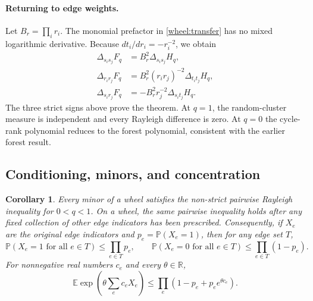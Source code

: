 \documentclass[11pt,a4paper]{article}
\newtheorem{corollary}[theorem]{Corollary}
\theoremstyle{definition}
\theoremstyle{remark}\newtheorem{remark}[theorem]{Remark}
\begin{document}
\paragraph{Returning to edge weights.}
Let $B_r=\prod_i r_i$. The monomial prefactor in \eqref{wheel:transfer} has no mixed logarithmic derivative. Because $dt_i/dr_i=-r_i^{-2}$, we obtain
\begin{align*}
 \Delta_{s_i s_j}F_q&=B_r^2\Delta_{s_i s_j}H_q,\\
 \Delta_{r_i r_j}F_q&=B_r^2(r_i r_j)^{-2}\Delta_{t_i t_j}H_q,\\
 \Delta_{s_i r_j}F_q&=-B_r^2r_j^{-2}\Delta_{s_i t_j}H_q.
\end{align*}
The three strict signs above prove the theorem. At $q=1$, the random-cluster measure is independent and every Rayleigh difference is zero. At $q=0$ the cycle-rank polynomial reduces to the forest polynomial, consistent with the earlier forest result.

\subsection{Conditioning, minors, and concentration}

\begin{corollary}\label{cor:wheel-conditioning}
Every minor of a wheel satisfies the non-strict pairwise Rayleigh
inequality for $0<q<1$. On a wheel, the same pairwise inequality holds
after any fixed collection of other edge indicators has been prescribed.
Consequently, if $X_e$ are the original edge indicators and
$p_e=\mathbb P(X_e=1)$, then for any edge set $T$,
\[
 \mathbb P(X_e=1\text{ for all }e\in T)\le\prod_{e\in T}p_e,
 \qquad
 \mathbb P(X_e=0\text{ for all }e\in T)\le\prod_{e\in T}(1-p_e).
\]
For nonnegative real numbers $c_e$ and every $\theta\in\mathbb R$,
\begin{equation}\label{wheel:mgf}
 \mathbb E\exp\left(\theta\sum_e c_eX_e\right)
 \le\prod_e\left(1-p_e+p_e e^{\theta c_e}\right).
\end{equation}
\end{corollary}
\end{document}

